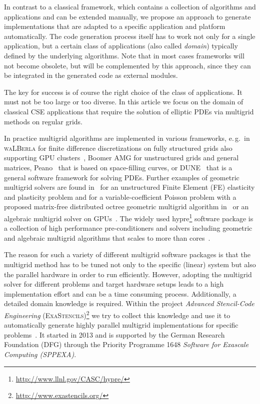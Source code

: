 \documentclass[onecolumn]{svjour3}
\newcommand{\Walberla}{\textsc{waLBerla}}
\newcommand{\exastencils}{\textsc{ExaStencils}}
\begin{document}
In contrast to a classical framework, which contains a collection of algorithms and applications and can be extended manually, we propose an approach to generate implementations that are adapted to a specific application and platform automatically. 
The code generation process itself has to work not only for a single application, but a certain class of applications (also called \textit{domain}) typically defined by the underlying algorithms. Note that in most cases frameworks will not become obsolete, but will be complemented by this approach, since they can be integrated in the generated code as external modules.

The key for success is of course the right choice of the class of applications. It must not be too large or too diverse.
In this article we focus on the domain of classical CSE applications that require the solution of elliptic PDEs via multigrid methods on regular grids.

In practice multigrid algorithms are implemented in various frameworks, e.\,g.\ in \Walberla{} for finite difference discretizations on
fully structured grids also supporting GPU clusters~\cite{KoestlerRitterHarbin10}, Boomer AMG \cite{Falgout99} for unstructured grids and general matrices, Peano~\cite{bungartz2010pde} that is based on space-filling curves, or DUNE~\cite{Bastian2008} that is a general software framework for solving PDEs.
Further examples of geometric multigrid solvers are found in~\cite{Adams00} for an unstructured Finite Element (FE) elasticity and plasticity problem and for a variable-coefficient Poisson problem with a proposed matrix-free distributed octree geometric multigrid algorithm in~\cite{sampath2010parallel} or
an algebraic multigrid solver on GPUs~\cite{haase2010parallel}. The widely used hypre\footnote{\url{http://www.llnl.gov/CASC/hypre/}} software package is a collection of high performance pre-conditioners and solvers including geometric and algebraic multigrid algorithms that scales to more than  cores~\cite{baker2012scaling}.  

The reason for such a variety of different multigrid software packages is that the multigrid method has to be tuned not only to the specific (linear) system but also the parallel hardware in order to run efficiently.  
However, adopting the multigrid solver for different problems and target hardware setups leads to a high implementation effort and can be a time consuming process. Additionally, a detailed domain knowledge is required. Within the project \textit{Advanced Stencil-Code Engineering} (\exastencils)\footnote{\url{http://www.exastencils.org/}} we try to collect this knowledge and use it to automatically generate highly parallel multigrid implementations for specific problems~\cite{koestlerkuckukparco13,koestlerapelhistencils13,kronawitterhistencils13}. It started in 2013 and is supported by the German Research Foundation (DFG) through the Priority Programme 1648 \textit{Software for Exascale Computing (SPPEXA)}. 
\end{document}
